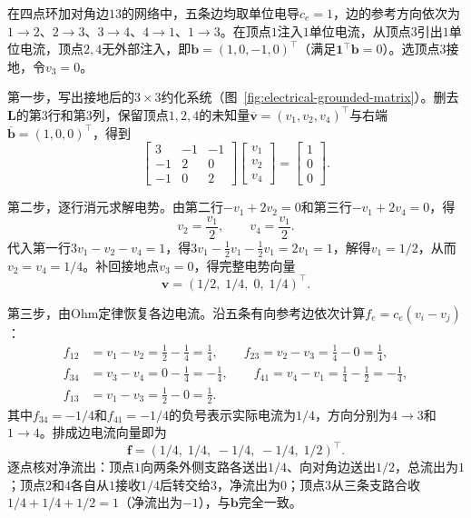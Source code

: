 \begin{example}[四点电网络的接地求解]
\label{ex:electrical-four-vertex-network}
在四点环加对角边$13$的网络中，五条边均取单位电导$c_e=1$，边的参考方向依次为$1\to2$、$2\to3$、$3\to4$、$4\to1$、$1\to3$。在顶点$1$注入$1$单位电流，从顶点$3$引出$1$单位电流，顶点$2,4$无外部注入，即$\bm b=(1,0,-1,0)^\top$（满足$\bm 1^\top\bm b=0$）。选顶点$3$接地，令$v_3 = 0$。

第一步，写出接地后的$3\times 3$约化系统（图~\ref{fig:electrical-grounded-matrix}）。删去$\bm L$的第$3$行和第$3$列，保留顶点$1,2,4$的未知量$\overline{\bm v}=(v_1,v_2,v_4)^\top$与右端$\overline{\bm b}=(1,0,0)^\top$，得到
\[
  \begin{bmatrix}
    3 & -1 & -1\\
    -1 & 2 & 0\\
    -1 & 0 & 2
  \end{bmatrix}
  \begin{bmatrix}
    v_1\\ v_2\\ v_4
  \end{bmatrix}
  =
  \begin{bmatrix}
    1\\ 0\\ 0
  \end{bmatrix}.
\]

第二步，逐行消元求解电势。由第二行$-v_1+2v_2=0$和第三行$-v_1+2v_4=0$，得
\[
  v_2 = \frac{v_1}{2},\qquad v_4 = \frac{v_1}{2}.
\]
代入第一行$3v_1 - v_2 - v_4 = 1$，得$3v_1 - \frac12 v_1 - \frac12 v_1 = 2v_1 = 1$，解得$v_1 = 1/2$，从而$v_2 = v_4 = 1/4$。补回接地点$v_3=0$，得完整电势向量
\[
  \bm v = (1/2, \; 1/4, \; 0, \; 1/4)^\top.
\]

第三步，由Ohm定律恢复各边电流。沿五条有向参考边依次计算$f_e = c_e(v_i - v_j)$：
\[
  \begin{aligned}
    f_{12} &= v_1 - v_2 = \tfrac12 - \tfrac14 = \tfrac14,\qquad
    f_{23} = v_2 - v_3 = \tfrac14 - 0 = \tfrac14,\\
    f_{34} &= v_3 - v_4 = 0 - \tfrac14 = -\tfrac14,\qquad
    f_{41} = v_4 - v_1 = \tfrac14 - \tfrac12 = -\tfrac14,\\
    f_{13} &= v_1 - v_3 = \tfrac12 - 0 = \tfrac12.
  \end{aligned}
\]
其中$f_{34}=-1/4$和$f_{41}=-1/4$的负号表示实际电流为$1/4$，方向分别为$4\to 3$和$1\to 4$。排成边电流向量即为
\[
  \bm f = (1/4, \; 1/4, \; -1/4, \; -1/4, \; 1/2)^\top.
\]
逐点核对净流出：顶点$1$向两条外侧支路各送出$1/4$、向对角边送出$1/2$，总流出为$1$；顶点$2$和$4$各自从$1$接收$1/4$后转交给$3$，净流出为$0$；顶点$3$从三条支路合收$1/4+1/4+1/2=1$（净流出为$-1$），与$\bm b$完全一致。
\end{example}

